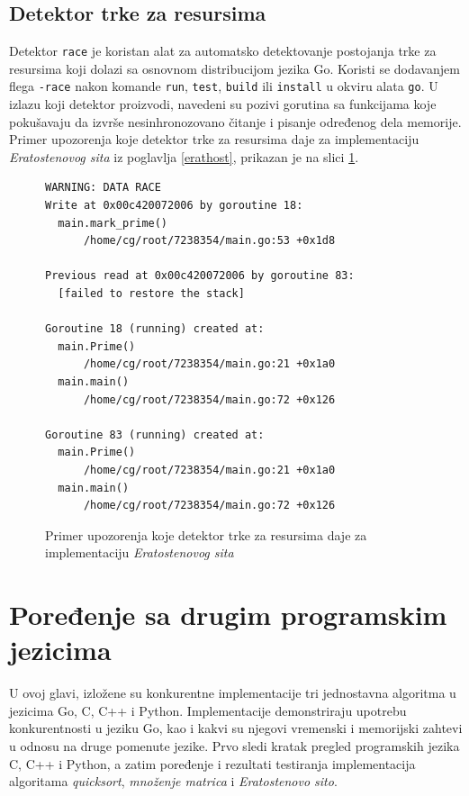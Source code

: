 \documentclass[12pt,oneside]{memoir}
\begin{document}
\section{Detektor trke za resursima} \label{datarace}

Detektor \texttt{race} je koristan alat za automatsko detektovanje postojanja trke za resursima koji dolazi sa osnovnom distribucijom jezika Go. Koristi se dodavanjem flega \texttt{-race} nakon komande \texttt{run}, \texttt{test}, \texttt{build} ili \texttt{install} u okviru alata \texttt{go}. U izlazu koji detektor proizvodi, navedeni su pozivi gorutina sa funkcijama koje pokušavaju da izvrše nesinhronozovano čitanje i pisanje određenog dela memorije. Primer upozorenja koje detektor trke za resursima daje za implementaciju \textit{Eratostenovog sita} iz poglavlja \ref{erathost}, prikazan je na slici \ref{fig:datarace}.

\begin{figure}
\begin{center}

\begin{Verbatim}[fontsize=\small]
WARNING: DATA RACE
Write at 0x00c420072006 by goroutine 18:
  main.mark_prime()
      /home/cg/root/7238354/main.go:53 +0x1d8

Previous read at 0x00c420072006 by goroutine 83:
  [failed to restore the stack]

Goroutine 18 (running) created at:
  main.Prime()
      /home/cg/root/7238354/main.go:21 +0x1a0
  main.main()
      /home/cg/root/7238354/main.go:72 +0x126

Goroutine 83 (running) created at:
  main.Prime()
      /home/cg/root/7238354/main.go:21 +0x1a0
  main.main()
      /home/cg/root/7238354/main.go:72 +0x126
\end{Verbatim}

\caption{Primer upozorenja koje detektor trke za resursima daje za implementaciju \textit{Eratostenovog sita}}
\label{fig:datarace}
\end{center}
\end{figure}



\chapter {Poređenje sa drugim programskim jezicima}
U ovoj glavi, izložene su konkurentne implementacije tri jednostavna algoritma u jezicima Go, C, C++ i Python.  Implementacije demonstriraju upotrebu konkurentnosti u jeziku Go, kao i kakvi su njegovi vremenski i memorijski zahtevi u odnosu na druge pomenute jezike. Prvo sledi kratak pregled programskih jezika C, C++ i Python, a zatim poređenje i rezultati testiranja implementacija algoritama \textit{quicksort}, \textit{množenje matrica} i \textit{Eratostenovo sito}.
\end{document}
